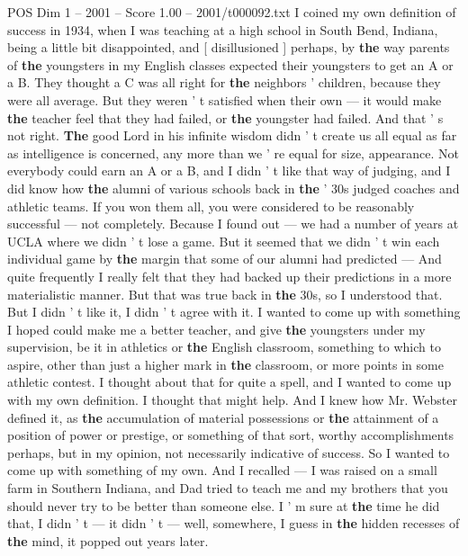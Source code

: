 \begin{textsample}{POS Dim 1 – 2001 – Score 1.00 – 2001/t000092.txt}  \label{ex:f1_pos_077}
I coined my own definition of success in 1934, when I was teaching at a high school in South Bend, Indiana, being a little bit disappointed, and [ disillusioned ] perhaps, by \textbf{the} way parents of \textbf{the} youngsters in my English classes expected their youngsters to get an A or a B.
They thought a C was all right for \textbf{the} neighbors ' children, because they were all average.
But they weren ' t satisfied when their own — it would make \textbf{the} teacher feel that they had failed, or \textbf{the} youngster had failed.
And that ' s not right. \textbf{The} good Lord in his infinite wisdom didn ' t create us all equal as far as intelligence is concerned, any more than we ' re equal for size, appearance.
Not everybody could earn an A or a B, and I didn ' t like that way of judging, and I did know how \textbf{the} alumni of various schools back in \textbf{the} ' 30s judged coaches and athletic teams.
If you won them all, you were considered to be reasonably successful — not completely.
Because I found out — we had a number of years at UCLA where we didn ' t lose a game.
But it seemed that we didn ' t win each individual game by \textbf{the} margin that some of our alumni had predicted — And quite frequently I really felt that they had backed up their predictions in a more materialistic manner.
But that was true back in \textbf{the} 30s, so I understood that.
But I didn ' t like it, I didn ' t agree with it.
I wanted to come up with something I hoped could make me a better teacher, and give \textbf{the} youngsters under my supervision, be it in athletics or \textbf{the} English classroom, something to which to aspire, other than just a higher mark in \textbf{the} classroom, or more points in some athletic contest.
I thought about that for quite a spell, and I wanted to come up with my own definition.
I thought that might help.
And I knew how Mr.
Webster defined it, as \textbf{the} accumulation of material possessions or \textbf{the} attainment of a position of power or prestige, or something of that sort, worthy accomplishments perhaps, but in my opinion, not necessarily indicative of success.
So I wanted to come up with something of my own.
And I recalled — I was raised on a small farm in Southern Indiana, and Dad tried to teach me and my brothers that you should never try to be better than someone else.
I ' m sure at \textbf{the} time he did that, I didn ' t — it didn ' t — well, somewhere, I guess in \textbf{the} hidden recesses of \textbf{the} mind, it popped out years later.

\end{textsample}
